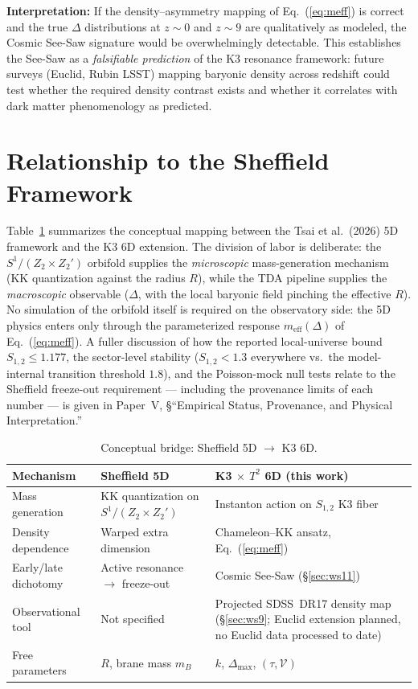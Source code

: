 \documentclass[12pt]{article}
\begin{document}
\noindent \textbf{Interpretation:}
If the density--asymmetry mapping of Eq.~(\ref{eq:meff}) is correct and the true $\Delta$ distributions at $z \sim 0$ and $z \sim 9$ are qualitatively as modeled, the Cosmic See-Saw signature would be overwhelmingly detectable.
This establishes the See-Saw as a \emph{falsifiable prediction} of the K3 resonance framework: future surveys (Euclid, Rubin LSST) mapping baryonic density across redshift could test whether the required density contrast exists and whether it correlates with dark matter phenomenology as predicted.

\section{Relationship to the Sheffield Framework}
\label{sec:sheffield}

Table~\ref{tab:sheffield_comparison} summarizes the conceptual mapping between the Tsai et al.\ (2026) 5D framework and the K3 6D extension.
The division of labor is deliberate: the $S^1/(Z_2 \times Z_2')$ orbifold supplies the \emph{microscopic} mass-generation mechanism (KK quantization against the radius $R$), while the TDA pipeline supplies the \emph{macroscopic} observable ($\Delta$, with the local baryonic field pinching the effective $R$).
No simulation of the orbifold itself is required on the observatory side: the 5D physics enters only through the parameterized response $m_{\mathrm{eff}}(\Delta)$ of Eq.~(\ref{eq:meff}).
A fuller discussion of how the reported local-universe bound $S_{1,2} \le 1.177$, the sector-level stability ($S_{1,2} < 1.3$ everywhere vs.\ the model-internal transition threshold $1.8$), and the Poisson-mock null tests relate to the Sheffield freeze-out requirement --- including the provenance limits of each number --- is given in Paper~V, \S``Empirical Status, Provenance, and Physical Interpretation.''

\begin{table}[h]
\centering
\caption{Conceptual bridge: Sheffield 5D $\to$ K3 6D.}
\label{tab:sheffield_comparison}
\begin{tabular}{p{3cm}p{5cm}p{5cm}}
\toprule
\textbf{Mechanism} & \textbf{Sheffield 5D} & \textbf{K3 $\times$ $T^2$ 6D (this work)} \\
\midrule
Mass generation & KK quantization on $S^1/(Z_2 \times Z_2')$ & Instanton action on $S_{1,2}$ K3 fiber \\
Density dependence & Warped extra dimension & Chameleon--KK ansatz, Eq.~(\ref{eq:meff}) \\
Early/late dichotomy & Active resonance $\to$ freeze-out & Cosmic See-Saw (\S\ref{sec:ws11}) \\
Observational tool & Not specified & Projected SDSS~DR17 density map (\S\ref{sec:ws9}; Euclid extension planned, no Euclid data processed to date) \\
Free parameters & $R$, brane mass $m_B$ & $k$, $\Delta_{\max}$, $(\tau, \mathcal{V})$ \\
\bottomrule
\end{tabular}
\end{table}
\end{document}
